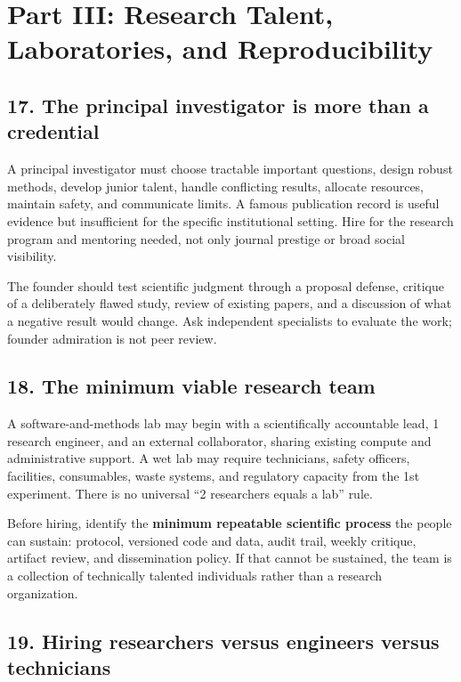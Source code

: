 \section{Part III: Research Talent, Laboratories, and Reproducibility}

\subsection{17. The principal investigator is more than a credential}

A principal investigator must choose tractable important questions, design robust methods, develop junior talent, handle conflicting results, allocate resources, maintain safety, and communicate limits. A famous publication record is useful evidence but insufficient for the specific institutional setting. Hire for the research program and mentoring needed, not only journal prestige or broad social visibility.

The founder should test scientific judgment through a proposal defense, critique of a deliberately flawed study, review of existing papers, and a discussion of what a negative result would change. Ask independent specialists to evaluate the work; founder admiration is not peer review.

\subsection{18. The minimum viable research team}

A software-and-methods lab may begin with a scientifically accountable lead, 1 research engineer, and an external collaborator, sharing existing compute and administrative support. A wet lab may require technicians, safety officers, facilities, consumables, waste systems, and regulatory capacity from the 1st experiment. There is no universal ``2 researchers equals a lab'' rule.

Before hiring, identify the \textbf{minimum repeatable scientific process} the people can sustain: protocol, versioned code and data, audit trail, weekly critique, artifact review, and dissemination policy. If that cannot be sustained, the team is a collection of technically talented individuals rather than a research organization.

\subsection{19. Hiring researchers versus engineers versus technicians}

